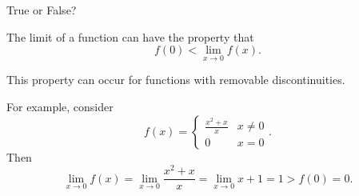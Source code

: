 \documentclass{ximera}
\author{Emma Smith Zbarsky}
\begin{document}
\begin{exercise}

True or False?

The limit of a function can have the property that
\[f(0) < \lim_{x\to 0} f(x).\]


\begin{hint}
This property can occur for functions with removable discontinuities.
\end{hint}


\begin{hint}
For example, consider
\[f(x) = \begin{cases} \frac{x^2+x}{x} & x \neq 0 \\ 0 & x = 0 \end{cases}.\]
Then
\[\lim_{x\to 0} f(x) = \lim_{x\to 0} \frac{x^2+x}{x} = \lim_{x\to 0} x+1 = 1 > f(0) = 0.\]
\end{hint}


\begin{multipleChoice}
\end{multipleChoice}

\end{exercise}
\end{document}
